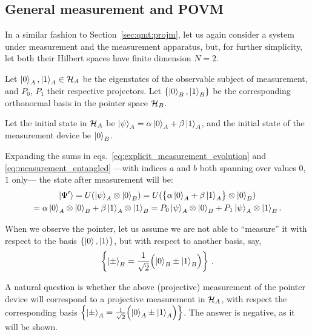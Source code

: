 \subsection{General measurement and POVM}
\label{subsec:POVM}

In a similar fashion to
Section~\ref{sec:qmt:projm},
let us again consider
a system under measurement
and the measurement apparatus,
but, for further simplicity, let both their Hilbert spaces have finite dimension $N=2$.

Let $\ket{0}_A, \ket{1}_A \in \mathcal{H}_A$ be the eigenstates 
of the observable subject of measurement,
and $P_0$, $P_1$ their respective projectors.
Let $\qty{\ket{0}_B, \ket{1}_B}$ be the corresponding orthonormal basis in the pointer space $\mathcal{H}_B$.

Let the initial state in $\mathcal{H}_A$ be $\ket{\psi}_A = \alpha\ket{0}_A + \beta\ket{1}_A$,
and the initial state of the measurement device be $\ket{0}_B$.

Expanding the sums in eqs.~\eqref{eq:explicit_measurement_evolution}
and \eqref{eq:measurement_entangled}
---with indices $a$ and $b$ both spanning over values $0$, $1$ only---
the state after measurement will be:
\begin{multline}\label{eq:qubit_ortho_measurement}
        \ket{\Psi'}
    = U( \ket{\psi}_A \otimes \ket{0}_B )
    = U( \qty\big{\alpha\ket{0}_A + \beta\ket{1}_A} \otimes \ket{0}_B )
    \\
    = \alpha\ket{0}_A \otimes \ket{0}_B + \beta\ket{1}_A  \otimes \ket{1}_B
    = P_0\ket{\psi}_A \otimes \ket{0}_B + P_1\ket{\psi}_A \otimes \ket{1}_B \text{.}
\end{multline}

When we observe the pointer, let us assume we are not
able to ``measure'' it with respect to the basis
$\left\{\ket{0}, \ket{1}\right\}$,
but with respect to another basis, say,
\begin{equation}\label{eq:pmbasis}
\left\{\ket{\pm}_B = \frac{1}{\sqrt{2}} \qty\Big(\ket{0}_B \pm \ket{1}_B)\right\} \,\text{.}
\end{equation}

A natural question is whether the above (projective) measurement
of the pointer device
will correspond to a projective
measurement in $\mathcal{H}_A$,
with respect the corresponding basis
$\left\{\ket{\pm}_A = \frac{1}{\sqrt{2}} \qty\Big(\ket{0}_A \pm \ket{1}_A)\right\}$.
The answer is negative, as it will be shown.

